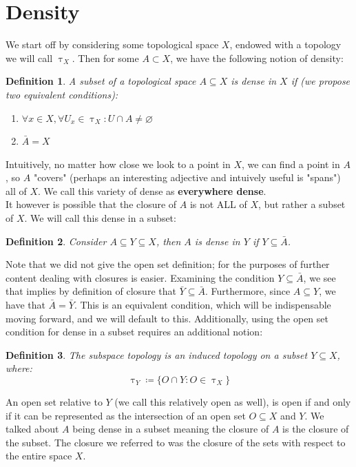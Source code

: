 \documentclass[10pt,letterpaper]{article} %
\newtheorem{defn}{Definition}[section]
\begin{document}
\section{Density}
We start off by considering some topological space $X$, endowed with a topology we will call $\uptau_X$. Then for some $A \subset X$, we have the following notion of density:
\begin{defn}
A subset of a topological space $A \subseteq X$ is dense in $X$ if (we propose two equivalent conditions):
\begin{enumerate}
  \item $\forall x \in X, \forall U_x \in \uptau_X: U \cap A \neq \varnothing$
  \item $\bar{A} = X$
\end{enumerate}

\end{defn}
Intuitively, no matter how close we look to a point in $X$, we can find a point in $A$, so $A$ "covers" (perhaps an interesting adjective and intuively useful is "spans") all of $X$. We call this variety of dense as \textbf{everywhere dense}.\\

It however is possible that the closure of $A$ is not ALL of $X$, but rather a subset of $X$. We will call this dense in a subset:
\begin{defn}
Consider $A \subseteq Y \subseteq X$, then $A$ is dense in $Y$ if $Y \subseteq \bar{A}$.
\end{defn}
Note that we did not give the open set definition; for the purposes of further content dealing with closures is easier. Examining the condition $Y \subseteq \bar{A}$, we see that implies by definition of closure that $\bar{Y} \subseteq \bar{A}$. Furthermore, since $A \subseteq Y$, we have that $\bar{A} = \bar{Y}$. This is an equivalent condition, which will be indispensable moving forward, and we will default to this. Additionally, using the open set condition for dense in a subset requires an additional notion:
\begin{defn}
The subspace topology is an induced topology on a subset $Y \subseteq X$, where:
\begin{equation*}
  \uptau_Y \coloneq \{O \cap Y : O \in \uptau_X\}
\end{equation*}
\end{defn}
An open set relative to $Y$ (we call this relatively open as well), is open if and only if it can be represented as the intersection of an open set $O \subseteq X$ and $Y$. We talked about $A$ being dense in a subset meaning the closure of $A$ is the closure of the subset. The closure we referred to was the closure of the sets with respect to the entire space $X$.\\
\end{document}
